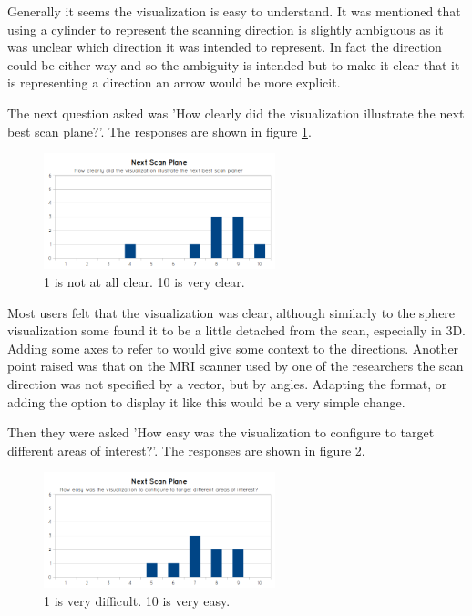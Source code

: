 Generally it seems the visualization is easy to understand. It was mentioned that using a cylinder to represent the scanning direction is slightly ambiguous as it was unclear which direction it was intended to represent. In fact the direction could be either way and so the ambiguity is intended but to make it clear that it is representing a direction an arrow would be more explicit.

The next question asked was 'How clearly did the visualization illustrate the next best scan plane?'. The responses are shown in figure \ref{fig:eval_next_scan_plane_q2}.

\begin{figure}[h]
    \centering
  \includegraphics[width=0.6\textwidth]{images/evaluation/graph_next_scan_plane_2.png}
    \caption{1 is not at all clear. 10 is very clear.}\label{fig:eval_next_scan_plane_q2}
\end{figure}

Most users felt that the visualization was clear, although similarly to the sphere visualization some found it to be a little detached from the scan, especially in 3D. Adding some axes to refer to would give some context to the directions. Another point raised was that on the MRI scanner used by one of the researchers the scan direction was not specified by a vector, but by angles. Adapting the format, or adding the option to display it like this would be a very simple change.

Then they were asked 'How easy was the visualization to configure to target different areas of interest?'. The responses are shown in figure \ref{fig:eval_next_scan_plane_q3}.

\begin{figure}[h]
    \centering
  \includegraphics[width=0.6\textwidth]{images/evaluation/graph_next_scan_plane_3.png}
    \caption{1 is very difficult. 10 is very easy.}\label{fig:eval_next_scan_plane_q3}
\end{figure}

